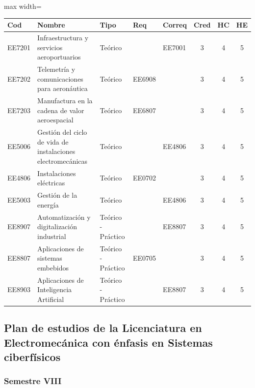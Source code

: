 \begin{center}
\small
\begin{adjustbox}{max width=\textwidth}
\begin{tabular}{|>{\RaggedRight\arraybackslash}p{1.25cm}|>{\RaggedRight\arraybackslash}p{5.2cm}|>{\RaggedRight\arraybackslash}p{1.65cm}|p{1.25cm}|p{1.25cm}|c|c|c|}
\hline
\rowcolor{grisEncabezado}
Cod & Nombre & Tipo & Req & Correq & Cred & HC & HE \\ \hline
EE7201 & Infraestructura y servicios aeroportuarios & Teórico &  & EE7001 & 3 & 4 & 5 \\ \hline
\rowcolor{azulTabla}
EE7202 & Telemetría y comunicaciones para aeronáutica & Teórico & EE6908 &  & 3 & 4 & 5 \\ \hline
EE7203 & Manufactura en la cadena de valor aeroespacial & Teórico & EE6807 &  & 3 & 4 & 5 \\ \hline
\rowcolor{azulTabla}
EE5006 & Gestión del ciclo de vida de instalaciones electromecánicas & Teórico &  & EE4806 & 3 & 4 & 5 \\ \hline
EE4806 & Instalaciones eléctricas & Teórico & EE0702 &  & 3 & 4 & 5 \\ \hline
\rowcolor{azulTabla}
EE5003 & Gestión de la energía & Teórico &  & EE4806 & 3 & 4 & 5 \\ \hline
EE8907 & Automatización y digitalización industrial & Teórico - Práctico &  & EE8807 & 3 & 4 & 5 \\ \hline
\rowcolor{azulTabla}
EE8807 & Aplicaciones de sistemas embebidos & Teórico - Práctico & EE0705 &  & 3 & 4 & 5 \\ \hline
EE8903 & Aplicaciones de Inteligencia Artificial & Teórico - Práctico &  & EE8807 & 3 & 4 & 5 \\ \hline
\end{tabular}
\end{adjustbox}
\end{center}

\subsection*{Plan de estudios de la Licenciatura en Electromecánica con énfasis en Sistemas ciberfísicos}

\subsubsection*{Semestre VIII}

